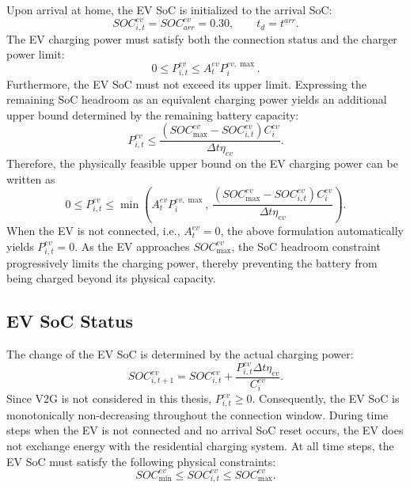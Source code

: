 Upon arrival at home, the EV SoC is initialized to the arrival SoC:
\[
  SOC^{ev}_{i,t}=SOC^{ev}_{arr}=0.30,
  \qquad t_d=t^{arr}.
\]
The EV charging power must satisfy both the connection status and the charger power limit:
\[
  0\le P^{ev}_{i,t}\le A^{ev}_t P^{ev,\max}_i.
\]
Furthermore, the EV SoC must not exceed its upper limit. Expressing the remaining SoC headroom as an equivalent charging power yields an additional upper bound determined by the remaining battery capacity:
\[
  P^{ev}_{i,t}
  \le
  \frac{(SOC^{ev}_{\max}-SOC^{ev}_{i,t})C^{ev}_i}
  {\Delta t\eta_{ev}}.
\]
Therefore, the physically feasible upper bound on the EV charging power can be written as
\[
  0\le P^{ev}_{i,t}\le
  \min
  \left(
  A^{ev}_t P^{ev,\max}_i,\,
  \frac{(SOC^{ev}_{\max}-SOC^{ev}_{i,t})C^{ev}_i}{\Delta t\eta_{ev}}
  \right).
\]
When the EV is not connected, i.e., \(A^{ev}_t=0\), the above formulation automatically yields \(P^{ev}_{i,t}=0\). As the EV approaches \(SOC^{ev}_{\max}\), the SoC headroom constraint progressively limits the charging power, thereby preventing the battery from being charged beyond its physical capacity.

\subsection{EV SoC Status}

The change of the EV SoC is determined by the actual charging power:
\[
  SOC^{ev}_{i,t+1}
  =
  SOC^{ev}_{i,t}
  +
  \frac{P^{ev}_{i,t}\Delta t\eta_{ev}}{C^{ev}_i}.
\]
Since V2G is not considered in this thesis, \(P^{ev}_{i,t}\ge 0\). Consequently, the EV SoC is monotonically non-decreasing throughout the connection window. During time steps when the EV is not connected and no arrival SoC reset occurs, the EV does not exchange energy with the residential charging system. At all time steps, the EV SoC must satisfy the following physical constraints:
\[
  SOC^{ev}_{\min}\le SOC^{ev}_{i,t}\le SOC^{ev}_{\max}.
\]

